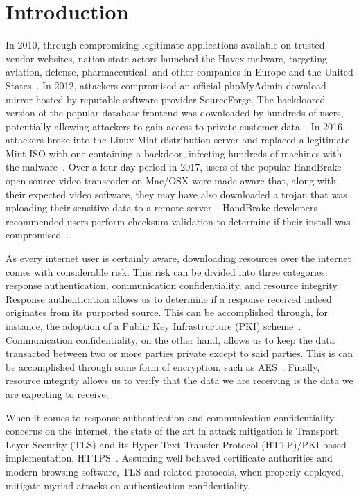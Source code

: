\section{Introduction} \label{sec:introduction}

In 2010, through compromising legitimate applications available on trusted
vendor websites, nation-state actors launched the Havex malware, targeting
aviation, defense, pharmaceutical, and other companies in Europe and the United
States~\cite{SCA-HAVEX1, SCA-HAVEX2}. In 2012, attackers compromised an official
phpMyAdmin download mirror hosted by reputable software provider SourceForge.
The backdoored version of the popular database frontend was downloaded by
hundreds of users, potentially allowing attackers to gain access to private
customer data~\cite{SCA-PMA1, SCA-PMA2}. In 2016, attackers broke into the Linux
Mint distribution server and replaced a legitimate Mint ISO with one containing
a backdoor, infecting hundreds of machines with the malware~\cite{SCA-MINT1,
SCA-MINT2}. Over a four day period in 2017, users of the popular HandBrake open
source video transcoder on Mac/OSX were made aware that, along with their
expected video software, they may have also downloaded a trojan that was
uploading their sensitive data to a remote server~\cite{SCA-HB1}. HandBrake
developers recommended users perform checksum validation to determine if their
install was compromised~\cite{SCA-HB2}.

As every internet user is certainly aware, downloading resources over the
internet comes with considerable risk. This risk can be divided into three
categories: response authentication, communication confidentiality, and resource
integrity. Response authentication allows us to determine if a response received
indeed originates from its purported source. This can be accomplished through,
for instance, the adoption of a Public Key Infrastructure (PKI)
scheme~\cite{PKI}. Communication confidentiality, on the other hand, allows us
to keep the data transacted between two or more parties private except to said
parties. This is can be accomplished through some form of encryption, such as
AES~\cite{AES}. Finally, resource integrity allows us to verify that the data we
are receiving is the data we are expecting to receive.

When it comes to response authentication and communication confidentiality
concerns on the internet, the state of the art in attack mitigation is Transport
Layer Security (TLS) and its Hyper Text Transfer Protocol (HTTP)/PKI based
implementation, HTTPS~\cite{TLS1.2, TLS1, TLS0, HTTPS, PKI}. Assuming well
behaved certificate authorities and modern browsing software, TLS and related
protocols, when properly deployed, mitigate myriad attacks on authentication
confidentiality.

